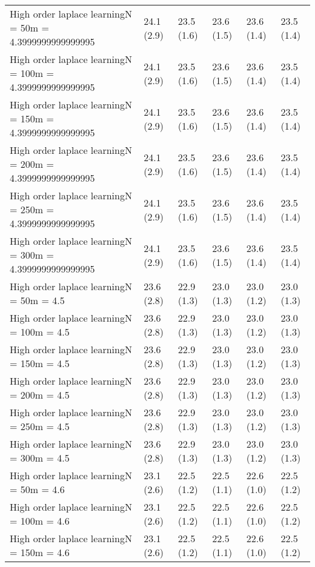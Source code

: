 \documentclass{article}
\begin{document}
\begin{table*}[t!]
\begin{center}
\begin{small}
\begin{sc}
\begin{tabular}{llllll}
High order laplace learningN = 50m = 4.3999999999999995&24.1 (2.9)      &23.5 (1.6)      &23.6 (1.5)      &23.6 (1.4)      &23.5 (1.4)      \\
High order laplace learningN = 100m = 4.3999999999999995&24.1 (2.9)      &23.5 (1.6)      &23.6 (1.5)      &23.6 (1.4)      &23.5 (1.4)      \\
High order laplace learningN = 150m = 4.3999999999999995&24.1 (2.9)      &23.5 (1.6)      &23.6 (1.5)      &23.6 (1.4)      &23.5 (1.4)      \\
High order laplace learningN = 200m = 4.3999999999999995&24.1 (2.9)      &23.5 (1.6)      &23.6 (1.5)      &23.6 (1.4)      &23.5 (1.4)      \\
High order laplace learningN = 250m = 4.3999999999999995&24.1 (2.9)      &23.5 (1.6)      &23.6 (1.5)      &23.6 (1.4)      &23.5 (1.4)      \\
High order laplace learningN = 300m = 4.3999999999999995&24.1 (2.9)      &23.5 (1.6)      &23.6 (1.5)      &23.6 (1.4)      &23.5 (1.4)      \\
High order laplace learningN = 50m = 4.5&23.6 (2.8)      &22.9 (1.3)      &23.0 (1.3)      &23.0 (1.2)      &23.0 (1.3)      \\
High order laplace learningN = 100m = 4.5&23.6 (2.8)      &22.9 (1.3)      &23.0 (1.3)      &23.0 (1.2)      &23.0 (1.3)      \\
High order laplace learningN = 150m = 4.5&23.6 (2.8)      &22.9 (1.3)      &23.0 (1.3)      &23.0 (1.2)      &23.0 (1.3)      \\
High order laplace learningN = 200m = 4.5&23.6 (2.8)      &22.9 (1.3)      &23.0 (1.3)      &23.0 (1.2)      &23.0 (1.3)      \\
High order laplace learningN = 250m = 4.5&23.6 (2.8)      &22.9 (1.3)      &23.0 (1.3)      &23.0 (1.2)      &23.0 (1.3)      \\
High order laplace learningN = 300m = 4.5&23.6 (2.8)      &22.9 (1.3)      &23.0 (1.3)      &23.0 (1.2)      &23.0 (1.3)      \\
High order laplace learningN = 50m = 4.6&23.1 (2.6)      &22.5 (1.2)      &22.5 (1.1)      &22.6 (1.0)      &22.5 (1.2)      \\
High order laplace learningN = 100m = 4.6&23.1 (2.6)      &22.5 (1.2)      &22.5 (1.1)      &22.6 (1.0)      &22.5 (1.2)      \\
High order laplace learningN = 150m = 4.6&23.1 (2.6)      &22.5 (1.2)      &22.5 (1.1)      &22.6 (1.0)      &22.5 (1.2)      \\

\end{tabular}
\end{sc}
\end{small}
\end{center}
\end{table*}
\end{document}
